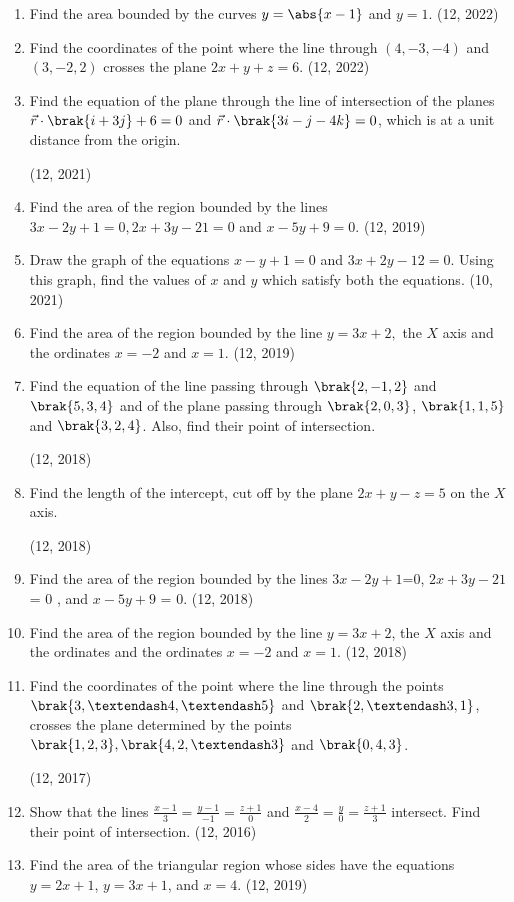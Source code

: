 \begin{enumerate}[label=\thesubsection.\arabic*, ref=\thesubsection.\theenumi]
\item Find the area bounded by the curves $y=\abs{x-1}$ and $y=1$. \hfill (12, 2022)

\item Find the coordinates of the point where the line through $(4,-3,-4)$ and $(3,-2,2)$ crosses the plane $2x+y+z=6$. \hfill (12, 2022)
\item Find the equation of the plane through the line of intersection of the planes 
  $\vec{r} \cdot \brak{i+3j} + 6 = 0 $
  and
  $\vec{r} \cdot \brak{3i - j - 4k} = 0$,
which is at a unit distance from the origin.

\hfill (12, 2021)
\item Find the area of the region bounded by the lines $3x - 2y + 1 = 0, 2x + 3y - 21 = 0$ and $x - 5y + 9 = 0$. \hfill (12, 2019)
\item Draw the graph of the equations $x - y + 1 = 0$ and $3x + 2y - 12 = 0$. Using this graph, find the values of $x$ and $y$ which satisfy both the equations.
\hfill (10, 2021)

\item Find the area of the region bounded by the line $y = 3x + 2,$ the $X$ axis and the ordinates $x = - 2$ and $x = 1$. \hfill (12, 2019)
\item Find the equation of the line passing through $\brak{2,-1, 2}$ and $\brak{5, 3, 4}$ and of the plane passing through $\brak{2, 0, 3}$, $\brak{1, 1, 5}$ and $\brak{3, 2, 4}$. Also, find their point of intersection.

	\hfill (12, 2018)
\item Find the length of the intercept, cut off by the plane $2x+y-z=5$ on the $X$ axis.

	\hfill (12, 2018)
\item Find the area of the region bounded by the lines $3x-2y+1$=$0$, $2x+3y-21$ = $0$ , and  $x-5y+9$ = $0$. \hfill (12, 2018)
\item Find the area of the region bounded by the line $y = 3x + 2$, the $X$ axis and the ordinates and the ordinates $x=-2$ and $x=1$. \hfill (12, 2018)
\item Find the coordinates of the point where the line through the points $\brak{3, – 4, – 5}$ and $\brak{2, – 3, 1}$, crosses the plane determined by the points $\brak{1, 2, 3}, \brak{4, 2, – 3}$ and $\brak{0, 4, 3}$.

	\hfill (12, 2017)
\item Show that the lines $\frac{x-1}{3} = \frac{y-1}{-1} = \frac{z+1}{0} $ and $\frac{x-4}{2} = \frac{y}{0} = \frac{z+1}{3} $ intersect. Find their point of intersection. \hfill (12, 2016)
	\item Find the area of the triangular region whose sides have the equations $y = 2x + 1$, $y = 3x + 1$, and $x = 4$. \hfill (12, 2019)
\end{enumerate}
